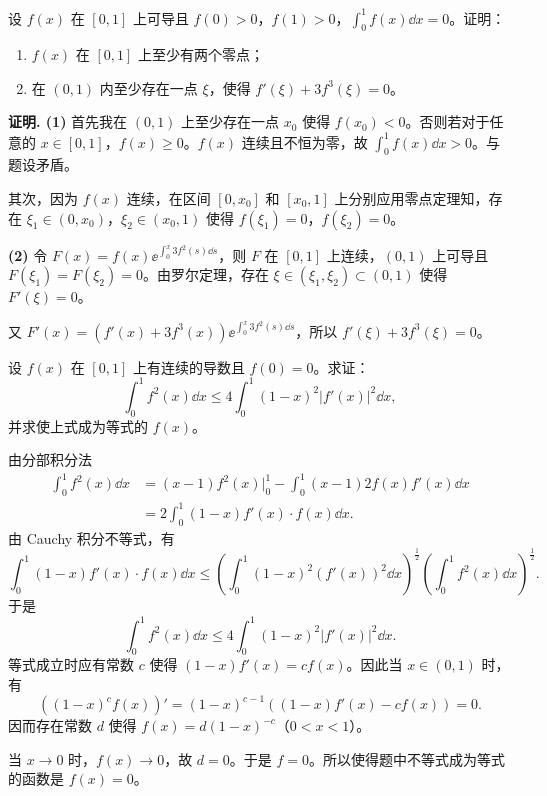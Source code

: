 设 $f(x)$ 在 $[0,1]$ 上可导且 $f(0)>0$，$f(1)>0$，$\displaystyle\int_0^1 f(x)\dd x=0$。证明：
\begin{enumerate}[label=(\arabic*)]
  \item $f(x)$ 在 $[0,1]$ 上至少有两个零点；
  \item 在 $(0,1)$ 内至少存在一点 $\xi$，使得 $f'(\xi)+3f^3(\xi)=0$。
\end{enumerate}

\begin{solution}
\textbf{证明. (1)} 首先我在 $(0,1)$ 上至少存在一点 $x_0$ 使得 $f(x_0)<0$。否则若对于任意的 $x\in[0,1]$，$f(x)\ge 0$。$f(x)$ 连续且不恒为零，故 $\int_0^1 f(x)\dd x>0$。与题设矛盾。

其次，因为 $f(x)$ 连续，在区间 $[0,x_0]$ 和 $[x_0,1]$ 上分别应用零点定理知，存在 $\xi_1\in(0,x_0)$，$\xi_2\in(x_0,1)$ 使得 $f(\xi_1)=0$，$f(\xi_2)=0$。

\textbf{(2)} 令 $F(x)=f(x)\ee^{\int_0^x 3f^2(s)\dd s}$，则 $F$ 在 $[0,1]$ 上连续，$(0,1)$ 上可导且 $F(\xi_1)=F(\xi_2)=0$。由罗尔定理，存在 $\xi\in(\xi_1,\xi_2)\subset(0,1)$ 使得 $F'(\xi)=0$。

又 $F'(x)=\left(f'(x)+3f^3(x)\right)\ee^{\int_0^x 3f^2(s)\dd s}$，所以 $f'(\xi)+3f^3(\xi)=0$。
\end{solution}

设 $f(x)$ 在 $[0,1]$ 上有连续的导数且 $f(0)=0$。求证：
\[ \int_0^1 f^2(x)\dd x\le 4\int_0^1(1-x)^2|f'(x)|^2\dd x, \]
并求使上式成为等式的 $f(x)$。

\begin{solution}
由分部积分法
\begin{align*}
\int_0^1 f^2(x)\dd x &= (x-1)f^2(x)\Big|_0^1-\int_0^1(x-1)2f(x)f'(x)\dd x\\
&= 2\int_0^1(1-x)f'(x)\cdot f(x)\dd x.
\end{align*}
由 Cauchy 积分不等式，有
\[ \int_0^1(1-x)f'(x)\cdot f(x)\dd x\le\left(\int_0^1(1-x)^2(f'(x))^2\dd x\right)^{\frac{1}{2}}\left(\int_0^1 f^2(x)\dd x\right)^{\frac{1}{2}}. \]
于是
\[ \int_0^1 f^2(x)\dd x\le 4\int_0^1(1-x)^2|f'(x)|^2\dd x. \]
等式成立时应有常数 $c$ 使得 $(1-x)f'(x)=cf(x)$。因此当 $x\in(0,1)$ 时，有
\[ \left((1-x)^cf(x)\right)'=(1-x)^{c-1}\left((1-x)f'(x)-cf(x)\right)=0. \]
因而存在常数 $d$ 使得 $f(x)=d(1-x)^{-c}$（$0<x<1$）。

当 $x\to0$ 时，$f(x)\to0$，故 $d=0$。于是 $f=0$。所以使得题中不等式成为等式的函数是 $f(x)=0$。
\end{solution}
